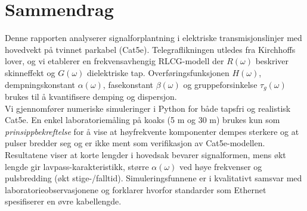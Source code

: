 \section*{Sammendrag}
Denne rapporten analyserer signalforplantning i elektriske transmisjonslinjer med hovedvekt på tvinnet parkabel (Cat5e). Telegraflikningen utledes fra Kirchhoffs lover, og vi etablerer en frekvensavhengig RLCG-modell der \(R(\omega)\) beskriver skinneffekt og \(G(\omega)\) dielektriske tap. Overføringsfunksjonen \(H(\omega)\), dempningskonstant \(\alpha(\omega)\), fasekonstant \(\beta(\omega)\) og gruppeforsinkelse \(\tau_g(\omega)\) brukes til å kvantifisere demping og dispersjon.\\[1em]
Vi gjennomfører numeriske simuleringer i Python for både tapsfri og realistisk Cat5e. En enkel laboratoriemåling på koaks (5 m og 30 m) brukes kun som \emph{prinsippbekreftelse} for å vise at høyfrekvente komponenter dempes sterkere og at pulser bredder seg og er ikke ment som verifikasjon av Cat5e-modellen.\\[1em]
Resultatene viser at korte lengder i hovedsak bevarer signalformen, mens økt lengde gir lavpass-karakteristikk, større \(\alpha(\omega)\) ved høye frekvenser og pulsbredding (økt stige-/falltid). Simuleringsfunnene er i kvalitativt samsvar med laboratorieobservasjonene og forklarer hvorfor standarder som Ethernet spesifiserer en øvre kabellengde.
